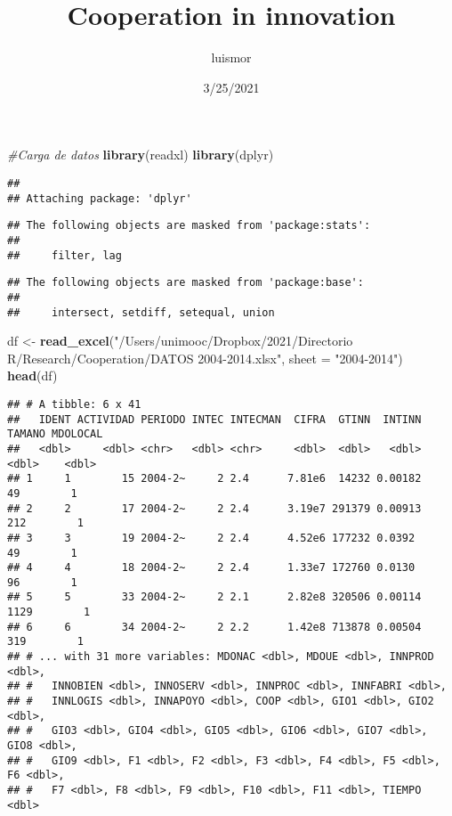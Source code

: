 \documentclass[
]{article}
\title{Cooperation in innovation}
\author{luismor}
\date{3/25/2021}
\newenvironment{Shaded}{\begin{snugshade}}{\end{snugshade}}
\newcommand{\CommentTok}[1]{\textcolor[rgb]{0.56,0.35,0.01}{\textit{#1}}}
\newcommand{\DataTypeTok}[1]{\textcolor[rgb]{0.13,0.29,0.53}{#1}}
\newcommand{\KeywordTok}[1]{\textcolor[rgb]{0.13,0.29,0.53}{\textbf{#1}}}
\newcommand{\NormalTok}[1]{#1}
\newcommand{\StringTok}[1]{\textcolor[rgb]{0.31,0.60,0.02}{#1}}
\begin{document}
\maketitle

\hypertarget{section}{%
\subsection{}\label{section}}

\begin{Shaded}
\begin{Highlighting}[]
\CommentTok{#Carga de datos}
\KeywordTok{library}\NormalTok{(readxl)}
\KeywordTok{library}\NormalTok{(dplyr)}
\end{Highlighting}
\end{Shaded}

\begin{verbatim}
## 
## Attaching package: 'dplyr'
\end{verbatim}

\begin{verbatim}
## The following objects are masked from 'package:stats':
## 
##     filter, lag
\end{verbatim}

\begin{verbatim}
## The following objects are masked from 'package:base':
## 
##     intersect, setdiff, setequal, union
\end{verbatim}

\begin{Shaded}
\begin{Highlighting}[]
\NormalTok{df <-}\StringTok{ }\KeywordTok{read_excel}\NormalTok{(}\StringTok{"/Users/unimooc/Dropbox/2021/Directorio R/Research/Cooperation/DATOS 2004-2014.xlsx"}\NormalTok{, }\DataTypeTok{sheet =} \StringTok{"2004-2014"}\NormalTok{)}
\KeywordTok{head}\NormalTok{(df)}
\end{Highlighting}
\end{Shaded}

\begin{verbatim}
## # A tibble: 6 x 41
##   IDENT ACTIVIDAD PERIODO INTEC INTECMAN  CIFRA  GTINN  INTINN TAMANO MDOLOCAL
##   <dbl>     <dbl> <chr>   <dbl> <chr>     <dbl>  <dbl>   <dbl>  <dbl>    <dbl>
## 1     1        15 2004-2~     2 2.4      7.81e6  14232 0.00182     49        1
## 2     2        17 2004-2~     2 2.4      3.19e7 291379 0.00913    212        1
## 3     3        19 2004-2~     2 2.4      4.52e6 177232 0.0392      49        1
## 4     4        18 2004-2~     2 2.4      1.33e7 172760 0.0130      96        1
## 5     5        33 2004-2~     2 2.1      2.82e8 320506 0.00114   1129        1
## 6     6        34 2004-2~     2 2.2      1.42e8 713878 0.00504    319        1
## # ... with 31 more variables: MDONAC <dbl>, MDOUE <dbl>, INNPROD <dbl>,
## #   INNOBIEN <dbl>, INNOSERV <dbl>, INNPROC <dbl>, INNFABRI <dbl>,
## #   INNLOGIS <dbl>, INNAPOYO <dbl>, COOP <dbl>, GIO1 <dbl>, GIO2 <dbl>,
## #   GIO3 <dbl>, GIO4 <dbl>, GIO5 <dbl>, GIO6 <dbl>, GIO7 <dbl>, GIO8 <dbl>,
## #   GIO9 <dbl>, F1 <dbl>, F2 <dbl>, F3 <dbl>, F4 <dbl>, F5 <dbl>, F6 <dbl>,
## #   F7 <dbl>, F8 <dbl>, F9 <dbl>, F10 <dbl>, F11 <dbl>, TIEMPO <dbl>
\end{verbatim}
\end{document}
